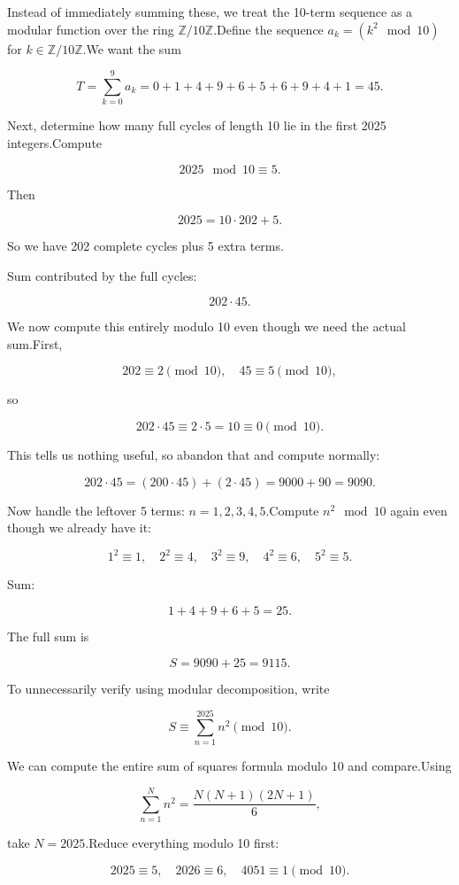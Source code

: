 \begin{enumerate}
 Instead of immediately summing these, we treat the 10-term sequence as a modular function over the ring \( \mathbb{Z}/10\mathbb{Z} \).Define the sequence \( a_k = (k^2 \mod 10) \) for \( k \in \mathbb{Z}/10\mathbb{Z} \).We want the sum

 
 \[T = \sum_{k=0}^9 a_k = 0 + 1 + 4 + 9 + 6 + 5 + 6 + 9 + 4 + 1 = 45.\]

 Next, determine how many full cycles of length 10 lie in the first 2025 integers.Compute

 
 \[2025 \mod 10 \equiv 5.\]

 Then

 
 \[2025 = 10 \cdot 202 + 5.\]

 So we have 202 complete cycles plus 5 extra terms.

 Sum contributed by the full cycles:

 
 \[202 \cdot 45.\]

 We now compute this entirely modulo 10 even though we need the actual sum.First,

 
 \[202 \equiv 2 \pmod{10}, \quad 45 \equiv 5 \pmod{10},\]

 so

 
 \[202 \cdot 45 \equiv 2 \cdot 5 = 10 \equiv 0 \pmod{10}.\]

 This tells us nothing useful, so abandon that and compute normally:

 
 \[202 \cdot 45 = (200 \cdot 45) + (2 \cdot 45) = 9000 + 90 = 9090.\]

 Now handle the leftover 5 terms: \( n = 1, 2, 3, 4, 5 \).Compute \( n^2 \mod 10 \) again even though we already have it:

 
 \[1^2 \equiv 1, \quad 2^2 \equiv 4, \quad 3^2 \equiv 9, \quad 4^2 \equiv 6, \quad 5^2 \equiv 5.\]

 Sum:

 
 \[1 + 4 + 9 + 6 + 5 = 25.\]

 The full sum is

 
 \[S = 9090 + 25 = 9115.\]

 To unnecessarily verify using modular decomposition, write

 
 \[S \equiv \sum_{n=1}^{2025} n^2 \pmod{10}.\]

 We can compute the entire sum of squares formula modulo 10 and compare.Using

 
 \[\sum_{n=1}^N n^2 = \frac{N(N+1)(2N+1)}{6},\]

 take \( N = 2025 \).Reduce everything modulo 10 first:

 
 \[2025 \equiv 5, \quad 2026 \equiv 6, \quad 4051 \equiv 1 \pmod{10}.\]


\end{enumerate}
